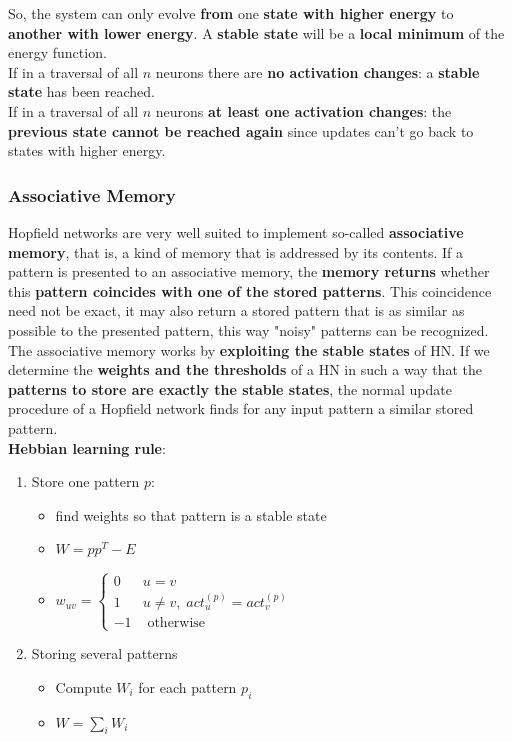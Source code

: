 \documentclass[11pt]{article}
\begin{document}
		So, the system can only evolve \textbf{from} one \textbf{state with higher energy} to \textbf{another with lower energy}. A \textbf{stable state} will be a \textbf{local minimum} of the energy function.\\
		
		If in a traversal of all $n$ neurons there are \textbf{no activation changes}: a \textbf{stable state} has been reached.\\
		If in a traversal of all $n$ neurons \textbf{at least one activation changes}: the \textbf{previous state cannot be reached again} since updates can't go back to states with higher energy.\\
		
		\newpage
		
		\subsubsection{Associative Memory}
		Hopfield networks are very well suited to implement so-called \textbf{associative memory}, that is, a kind of memory that is addressed by its contents. If a pattern is presented to an associative memory, the \textbf{memory returns} whether this \textbf{pattern coincides with one of the stored patterns}. This coincidence need not be exact, it may also return a stored pattern that is as similar as possible to the presented pattern, this way "noisy" patterns can be recognized.\\
		
		The associative memory works by \textbf{exploiting the stable states} of HN. If we determine the \textbf{weights and the thresholds} of a HN in such a way that the \textbf{patterns to store are exactly the stable states}, the normal update procedure of a Hopfield network finds for any input pattern a similar stored pattern.\\
		
		\textbf{Hebbian learning rule}:
		\begin{enumerate}
			\item Store one pattern $p$:
			\begin{itemize}
				\item find weights so that pattern is a stable state
				\item $ W = pp^T - E $
				\item $ w_{uv} = \begin{cases}
					0 & u = v \\
					1 & u \neq v, \; act_u^{(p)} = act_v^{(p)} \\
					-1 & \text{ otherwise}
				\end{cases}$
			\end{itemize}
			\nn
			
			\item Storing several patterns
			\begin{itemize}
				\item Compute $W_i$ for each pattern $p_i$
				\item $W = \sum_i W_i$
			\end{itemize}
		\end{enumerate}
		
\end{document}
